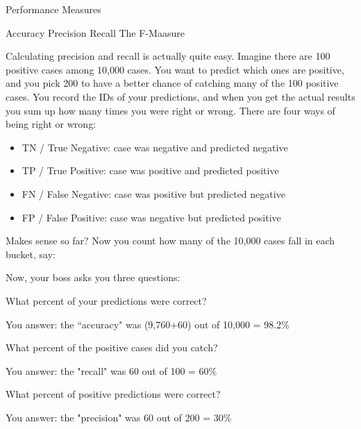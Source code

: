 Performance Measures

Accuracy
Precision
Recall
The F-Maasure






Calculating precision and recall is actually quite easy. Imagine there are 100 positive cases among 10,000 cases. You want to predict which ones are positive, and you pick 200 to have a better chance of catching many of the 100 positive cases.  You record the IDs of your predictions, and when you get the actual results you sum up how many times you were right or wrong. There are four ways of being right or wrong:

\begin{itemize}
\item TN / True Negative: case was negative and predicted negative
\item TP / True Positive: case was positive and predicted positive
\item FN / False Negative: case was positive but predicted negative
\item FP / False Positive: case was negative but predicted positive
\end{itemize}

Makes sense so far? Now you count how many of the 10,000 cases fall in each bucket, say:



Now, your boss asks you three questions:

What percent of your predictions were correct? 

You answer: the ``accuracy" was (9,760+60) out of 10,000 = 98.2\%

What percent of the positive cases did you catch? 

You answer: the "recall" was 60 out of 100 = 60\%

What percent of positive predictions were correct? 

You answer: the "precision" was 60 out of 200 = 30\%


\newpage

